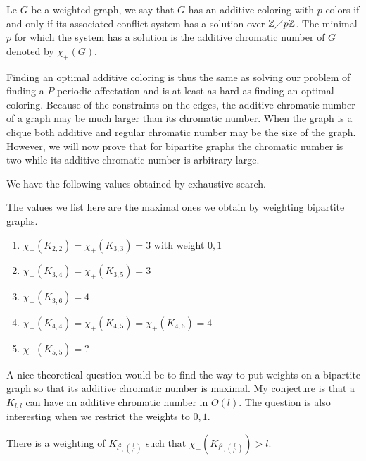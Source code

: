 \documentclass{article}
\begin{document}
\begin{definition}
 Le $G$ be a weighted graph, we say that $G$ has an additive coloring with $p$ colors if and only if its associated
 conflict system has a solution over $\mathbb{Z} \diagup p\mathbb{Z}$. The minimal $p$ for which the system has a solution is the additive chromatic number of $G$ denoted by $\chi_{+}(G)$.
\end{definition}

Finding an optimal additive coloring is thus the same as solving our problem of finding a $P$-periodic affectation
and is at least as hard as finding an optimal coloring.  Because of the constraints on the edges, 
the additive chromatic number of a graph may be much larger than its chromatic number.
When the graph is a clique both additive and regular chromatic number may be the size of the graph.
However, we will now prove that for bipartite graphs the chromatic number is two while its additive 
chromatic number is arbitrary large.

We have the following values obtained by exhaustive search.

\begin{fact}
 The values we list here are the maximal ones we obtain 
 by weighting bipartite graphs.
 \begin{enumerate}
  \item  $\chi_{+}(K_{2,2})= \chi_{+}(K_{3,3}) = 3$ with weight $0,1$
  \item $\chi_{+}(K_{3,4}) = \chi_{+}(K_{3,5}) =3$ 
  \item $\chi_{+}(K_{3,6}) = 4$ 
  \item  $\chi_{+}(K_{4,4})=\chi_{+}(K_{4,5})=\chi_{+}(K_{4,6})=4$
  \item $\chi_{+}(K_{5,5})= ?$
 \end{enumerate}
 \end{fact}

 A nice theoretical question would be to find the way to put weights
 on a bipartite graph so that its additive chromatic number is maximal. 
 My conjecture is that a $K_{l,l}$ can have an additive chromatic number in $O(l)$.
 The question is also interesting when we restrict the weights to $0,1$.
 
\begin{theorem}
 There is a weighting of $K_{l^2,\binom{l}{l^2}}$ such that 
 $\chi_{+}(K_{l^2,\binom{l}{l^2}}) > l$.
\end{theorem}
\end{document}
